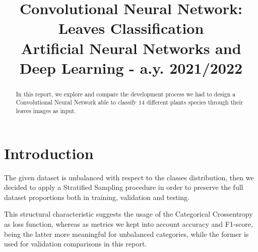 \documentclass[conference,compsoc]{IEEEtran}
\begin{document}
\title{Convolutional Neural Network:\\ Leaves Classification
\\ \large Artificial Neural Networks and Deep Learning - a.y. 2021/2022}

\author{
\and
{}
}

\maketitle

\begin{abstract}
In this report, we explore and compare the development process we had to design a Convolutional Neural Network able to classify 14 different plants species through their leaves images as input.
\end{abstract}
\IEEEpeerreviewmaketitle

\section{Introduction}
The given dataset is unbalanced with respect to the classes distribution, then we decided to apply a Stratified Sampling procedure in order to preserve the full dataset proportions both in training, validation and testing.

This structural characteristic suggests the usage of the Categorical Crossentropy as loss function, whereas as metrics we kept into account accuracy and F1-score, being the latter more meaningful for unbalanced categories, while the former is used for validation comparisons in this report.
\end{document}
